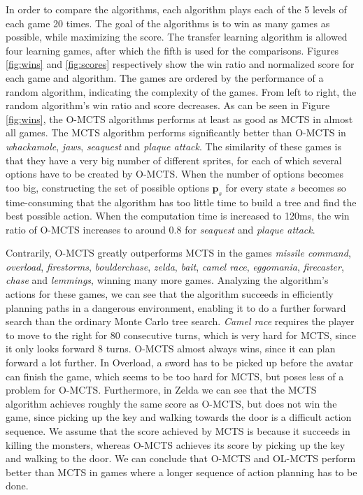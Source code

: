 In order to compare the algorithms, each algorithm plays each of the 5 levels
of each game 20 times. The goal of the algorithms is to win as many games as
possible, while maximizing the score. The transfer learning algorithm is
allowed four learning games, after which the fifth is used for the
comparisons. Figures \ref{fig:wins} and \ref{fig:scores} respectively show the
win ratio and normalized score for each game and algorithm. The games are
ordered by the performance of a random algorithm, indicating the complexity of
the games. From left to right, the random algorithm's win ratio and score
decreases. As can be seen in Figure \ref{fig:wins}, the O-MCTS algorithms
performs at least as good as MCTS in almost all games. The MCTS algorithm
performs significantly better than O-MCTS in \textit{whackamole}, \textit{jaws},
\textit{seaquest} and \textit{plaque attack}. The similarity of these games is
that they have a very big number of different sprites, for each of which several
options have to be created by O-MCTS.  When the number of options becomes too
big, constructing the set of possible options $\mathbf{p}_s$ for every state $s$
becomes so time-consuming that the algorithm has too little time to build a tree
and find the best possible action. When the computation time is increased to
120ms, the win ratio of O-MCTS increases to around $0.8$ for \textit{seaquest}
and \textit{plaque attack}.

Contrarily, O-MCTS greatly outperforms MCTS in the games \textit{missile
command}, \textit{overload}, \textit{firestorms}, \textit{boulderchase},
\textit{zelda}, \textit{bait}, \textit{camel race}, \textit{eggomania},
\textit{firecaster}, \textit{chase} and \textit{lemmings}, winning many more
games. Analyzing the algorithm's actions for these games, we can see that
the algorithm succeeds in efficiently planning paths in a dangerous environment,
enabling it to do a further forward search than the ordinary Monte Carlo tree
search. \textit{Camel race} requires the player to move to the right for 80
consecutive turns, which is very hard for MCTS, since it only looks forward 8
turns. O-MCTS almost always wins, since it can plan forward a lot further. In
Overload, a sword has to be picked up before the avatar can finish the game,
which seems to be too hard for MCTS, but poses less of a problem for O-MCTS.
Furthermore, in Zelda we can see that the MCTS algorithm achieves roughly the
same score as O-MCTS, but does not win the game, since picking up the key and
walking towards the door is a difficult action sequence. We assume that the
score achieved by MCTS is because it succeeds in killing the monsters, whereas
O-MCTS achieves its score by picking up the key and walking to the door. We can
conclude that O-MCTS and OL-MCTS perform better than MCTS in games where a
longer sequence of action planning has to be done.

